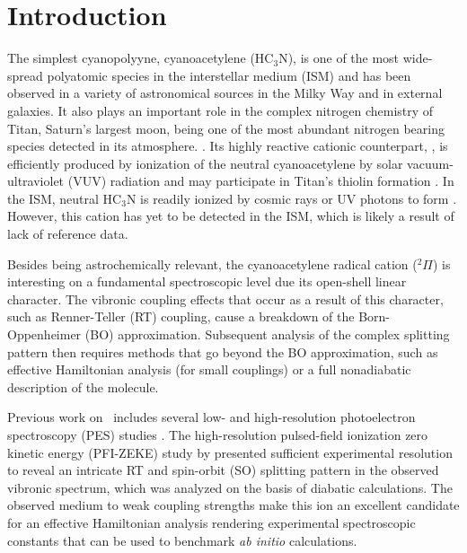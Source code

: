 \section{Introduction}
The simplest cyanopolyyne,  cyanoacetylene (HC$_3$N), is one of the most wide-spread polyatomic species in the interstellar medium (ISM) and has been observed in a variety of astronomical sources in the Milky Way and in external galaxies\cite{Turner1971DetectionCyanoacetylene,Morris1976CyanoacetleneClouds, Mauersberger1990DenseProbe}. 
It also plays an important role in the complex nitrogen chemistry of Titan, Saturn's largest moon, being one of the most abundant nitrogen bearing species detected in its atmosphere. \cite{Cordiner2014ALMAAtmosphere,Thelen2019AbundanceObservations}.
Its highly reactive cationic counterpart, \ion, is efficiently produced by ionization of the neutral cyanoacetylene by solar vacuum-ultraviolet (VUV) radiation and may participate in Titan's thiolin formation \cite{VYA2006}.
In the ISM, neutral HC$_3$N is readily ionized by cosmic rays or UV photons to form \ion \cite{Wakelam2012AKIDA}.  However, this cation has yet to be detected in the ISM, which is likely a result of lack of reference data.

Besides being astrochemically relevant, the cyanoacetylene radical cation ($ ^2\Pi$) is interesting on a fundamental spectroscopic level due its open-shell linear character. 
The vibronic coupling effects that occur as a result of this character, such as Renner-Teller (RT) \cite{RennerZurMolekiilen} coupling, cause a breakdown of the Born-Oppenheimer (BO) approximation. 
Subsequent analysis of the complex splitting pattern then requires methods that go beyond the BO approximation, such as effective Hamiltonian analysis (for small couplings)\cite{He2005} or a full nonadiabatic description of the molecule.\cite{Peric2007AMolecule,Koppel1981VibronicStates}

Previous work on \ion\ includes several low- and high-resolution photoelectron spectroscopy (PES) studies \cite{Dai2015TheCalculations,Desrier2016ExperimentalSpectroscopy,Gans2016ExperimentalSpectroscopy,Leach2014IonizationCyanoacetylene}. The high-resolution pulsed-field ionization zero kinetic energy (PFI-ZEKE) study by  \citet{Dai2015TheCalculations} presented sufficient experimental resolution to reveal an intricate RT and spin-orbit (SO) splitting pattern in the observed vibronic spectrum, which was analyzed on the basis of diabatic calculations. 
The observed medium to weak coupling strengths make this ion an excellent candidate for an effective Hamiltonian analysis rendering experimental spectroscopic constants that can be used to benchmark \emph{ab initio} calculations.

